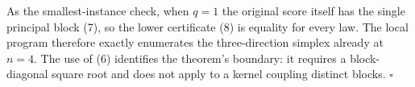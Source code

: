 As the smallest-instance check, when \(q=1\) the original score itself has the single principal block (7), so the lower certificate (8) is equality for every law. The local program therefore exactly enumerates the three-direction simplex already at \(n=4\). The use of (6) identifies the theorem's boundary: it requires a block-diagonal square root and does not apply to a kernel coupling distinct blocks. \(\square\)